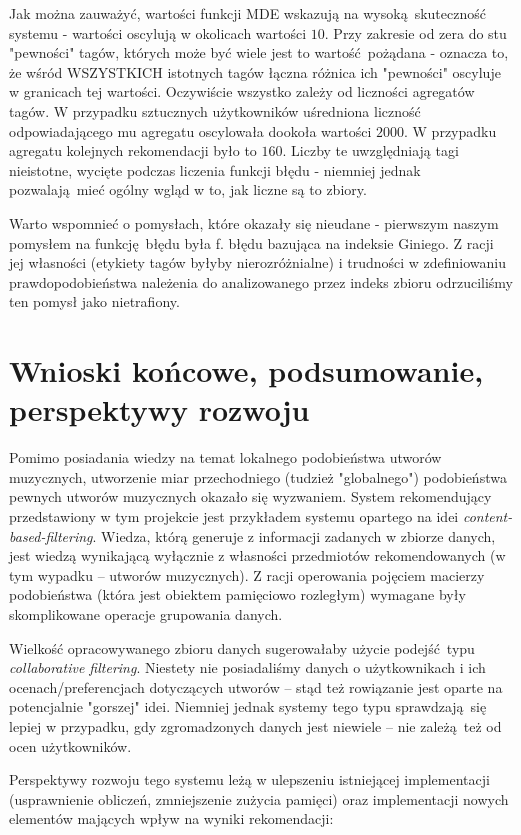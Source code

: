\documentclass[a4paper,10pt]{article}
\begin{document}
Jak można zauważyć, wartości funkcji MDE wskazują na wysoką skuteczność systemu - wartości oscylują w okolicach wartości $10$. Przy zakresie od zera do stu "pewności" tagów, których może być wiele jest to wartość pożądana - oznacza to, że wśród WSZYSTKICH istotnych tagów łączna różnica ich "pewności" oscyluje w granicach tej wartości. Oczywiście wszystko zależy od liczności agregatów tagów. W przypadku sztucznych użytkowników uśredniona liczność odpowiadającego mu agregatu oscylowała dookoła wartości $2000$. W przypadku agregatu kolejnych rekomendacji było to $160$. Liczby te uwzględniają tagi nieistotne, wycięte podczas liczenia funkcji błędu - niemniej jednak pozwalają mieć ogólny wgląd w to, jak liczne są to zbiory.

Warto wspomnieć o pomysłach, które okazały się nieudane - pierwszym naszym pomysłem na funkcję błędu była f. błędu bazująca na indeksie Giniego. Z racji jej własności (etykiety tagów byłyby nierozróżnialne) i trudności w zdefiniowaniu prawdopodobieństwa należenia do analizowanego przez indeks zbioru odrzuciliśmy ten pomysł jako nietrafiony.

\section{Wnioski końcowe, podsumowanie, perspektywy rozwoju}

Pomimo posiadania wiedzy na temat lokalnego podobieństwa utworów muzycznych, utworzenie miar przechodniego (tudzież "globalnego") podobieństwa pewnych utworów muzycznych okazało się wyzwaniem. System rekomendujący przedstawiony w tym projekcie jest przykładem systemu opartego na idei \textit{content-based-filtering}. Wiedza, którą generuje z informacji zadanych w zbiorze danych, jest wiedzą wynikającą wyłącznie z własności przedmiotów rekomendowanych (w tym wypadku -- utworów muzycznych). Z racji operowania pojęciem macierzy podobieństwa (która jest obiektem pamięciowo rozległym) wymagane były skomplikowane operacje grupowania danych.

Wielkość opracowywanego zbioru danych sugerowałaby użycie podejść typu \textit{collaborative filtering}. Niestety nie posiadaliśmy danych o użytkownikach i ich ocenach/preferencjach dotyczących utworów -- stąd też rowiązanie jest oparte na potencjalnie "gorszej" idei. Niemniej jednak systemy tego typu sprawdzają się lepiej w przypadku, gdy zgromadzonych danych jest niewiele -- nie zależą też od ocen użytkowników.

Perspektywy rozwoju tego systemu leżą w ulepszeniu istniejącej implementacji (usprawnienie obliczeń, zmniejszenie zużycia pamięci) oraz implementacji nowych elementów mających wpływ na wyniki rekomendacji:
\end{document}
